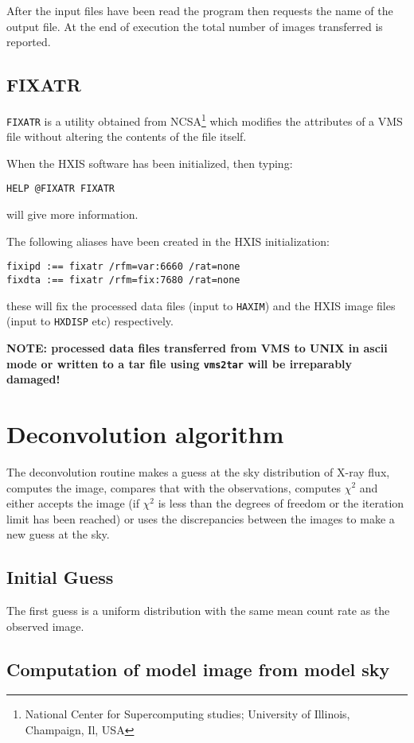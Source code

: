 After the input files have been read the program then requests the name
of the output file. At the end of execution the total number of images
transferred is reported.

\subsection{FIXATR}
\label{FIXATR}

\verb!FIXATR! is a utility obtained from NCSA\footnote{National Center
for Supercomputing studies; University of Illinois, Champaign, Il, USA}
which modifies the attributes of a VMS file without altering the
contents of the file itself.

When the HXIS software has been initialized, then typing:
\begin{verbatim}
HELP @FIXATR FIXATR
\end{verbatim}
will give more information.

The following aliases have been created in the HXIS initialization:
\begin{verbatim}
fixipd :== fixatr /rfm=var:6660 /rat=none
fixdta :== fixatr /rfm=fix:7680 /rat=none
\end{verbatim}
these will fix the processed data files (input to \verb!HAXIM!) and the
HXIS image files (input to \verb!HXDISP! etc) respectively.

{\large \bf NOTE: processed data files transferred from VMS to UNIX in
ascii mode or written to a tar file using {\tt vms2tar} will be irreparably
damaged!}

\appendix
\section{Deconvolution algorithm}
\label{ALGO}
The deconvolution routine makes a guess at the sky distribution of
X-ray flux, computes the image, compares that with the observations,
computes $\chi^2$ and either accepts the image (if $\chi^2$ is less
than the degrees of freedom or the iteration limit has been reached) or
uses the discrepancies between the images to make a new guess at the
sky.

\subsection{Initial Guess}

The first guess is a uniform distribution
with the same mean count rate as the observed image.

\subsection{Computation of model image from model sky}

